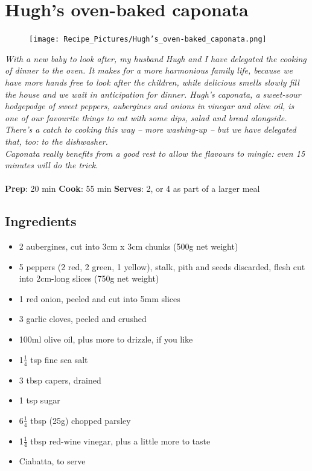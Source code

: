 \documentclass{book}
\begin{document}
\section{Hugh’s oven-baked caponata}
\begin{figure}
\centering\texttt{[image: Recipe\_Pictures/Hugh’s\_oven-baked\_caponata.png]}
\end{figure}
\emph{With a new baby to look after, my husband Hugh and I have delegated the cooking of dinner to the oven. It makes for a more harmonious family life, because we have more hands free to look after the children, while delicious smells slowly fill the house and we wait in anticipation for dinner. Hugh’s caponata, a sweet-sour hodgepodge of sweet peppers, aubergines and onions in vinegar and olive oil, is one of our favourite things to eat with some dips, salad and bread alongside. There’s a catch to cooking this way – more washing-up – but we have delegated that, too: to the dishwasher.\\ 
Caponata really benefits from a good rest to allow the flavours to mingle: even 15 minutes will do the trick.}\\\\ 
\textbf{Prep}: 20 min
\textbf{Cook}: 55 min
\textbf{Serves}: 2, or 4 as part of a larger meal
\subsection*{Ingredients}
\begin{itemize}
\item 2 aubergines, cut into 3cm x 3cm chunks (500g net weight)
\item 5 peppers (2 red, 2 green, 1 yellow), stalk, pith and seeds discarded, flesh cut into 2cm-long slices (750g net weight)
\item 1 red onion, peeled and cut into 5mm slices
\item 3 garlic cloves, peeled and crushed
\item 100ml olive oil, plus more to drizzle, if you like
\item 1$\frac{1}{4}$ tsp fine sea salt 
\item 3 tbsp capers, drained 
\item 1 tsp sugar 
\item 6$\frac{1}{4}$ tbsp (25g) chopped parsley
\item 1$\frac{1}{4}$ tbsp red-wine vinegar, plus a little more to taste
\item Ciabatta, to serve
\end{itemize}
\end{document}
